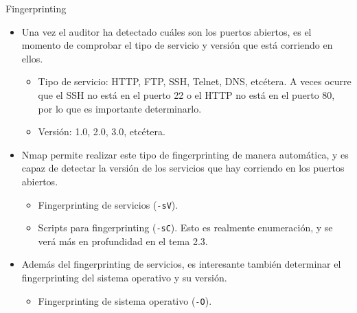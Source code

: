 \documentclass[aspectratio=169,11pt]{beamer}
\begin{document}
\begin{frame}{Fingerprinting}
\small
  \begin{itemize}
  \item Una vez el auditor ha detectado cuáles son los puertos abiertos, es el momento de comprobar el tipo de servicio y versión que está corriendo en ellos.
    \begin{itemize}
    \item Tipo de servicio: HTTP, FTP, SSH, Telnet, DNS, etcétera. A veces ocurre que el SSH no está en el puerto 22 o el HTTP no está en el puerto 80, por lo que es importante determinarlo.
    \item Versión: 1.0, 2.0, 3.0, etcétera.
    \end{itemize}
  \item Nmap permite realizar este tipo de fingerprinting de manera automática, y es capaz de detectar la versión de los servicios que hay corriendo en los puertos abiertos.
    \begin{itemize}
    \item Fingerprinting de servicios (\verb|-sV|).
    \item Scripts para fingerprinting (\verb|-sC|). Esto es realmente enumeración, y se verá más en profundidad en el tema 2.3.
    \end{itemize}
  \item Además del fingerprinting de servicios, es interesante también determinar el fingerprinting del sistema operativo y su versión.
    \begin{itemize}
    \item Fingerprinting de sistema operativo (\verb|-O|).
    \end{itemize}
  \end{itemize}
\end{frame}
\end{document}
